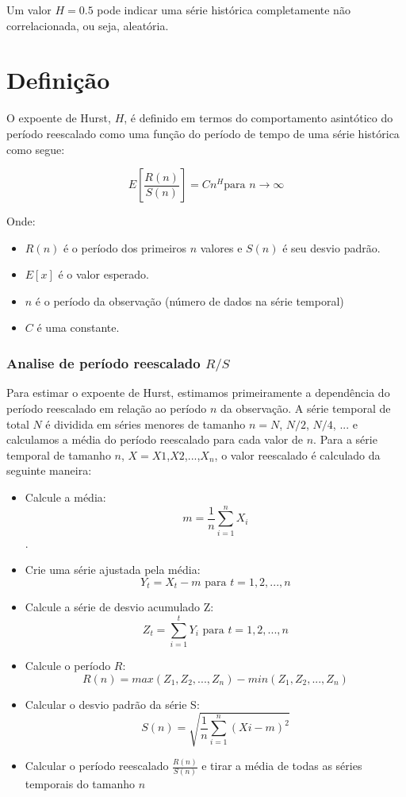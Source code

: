 \documentclass[11pt]{book}
\begin{document}
Um valor $H=0.5$ pode indicar uma série histórica completamente não correlacionada, ou seja, aleatória.

\chapter{Definição}

O expoente de Hurst, $H$, é definido em termos do comportamento asintótico do período reescalado  como uma função do período de tempo de uma série histórica como segue\cite{Qian}\cite{feders}:

\[
    E[\frac{R(n)}{S(n)}] = Cn^H \text{para } n\to\infty
\]

Onde:

\begin{itemize}
    \item $R(n)$ é o período dos primeiros $n$ valores e $S(n)$ é seu desvio padrão.
    \item $E[x]$ é o valor esperado.
    \item $n$ é o período da observação (número de dados na série temporal)
    \item $C$ é uma constante.
\end{itemize}

\subsection{Analise de período reescalado $R/S$}

Para estimar o expoente de Hurst, estimamos primeiramente a dependência do período reescalado em relação ao período $n$ da observação\cite{feders}. A série temporal de total $N$ é dividida em séries menores de tamanho $n=N$, $N/2$, $N/4$, ... e calculamos a média do período reescalado para cada valor de $n$. Para a série temporal de tamanho $n$, $X=X1$,$X2$,...,$X_n$, o valor reescalado é calculado da seguinte maneira:

\begin{itemize}
    \item Calcule a média: $$m=\frac{1}{n}  \sum_{i=1}^{n} X_i$$.
    \item Crie uma série ajustada pela média: $$Y_t = X_t - m \text{ para }  t=1,2,...,n$$
    \item Calcule a série de desvio acumulado Z: $$Z_t = \sum_{i=1}^{t}Y_i \text{ para }  t=1,2,...,n$$ 
    \item Calcule o período $R$: $$ R(n) = max(Z_1,Z_2,...,Z_n) - min(Z_1,Z_2,...,Z_n)$$ 
    \item Calcular o desvio padrão da série S: $$S(n) = \sqrt{\frac{1}{n} \sum_{i=1}^{n} (Xi - m)^2}$$
    \item Calcular o período reescalado $\frac{R(n)}{S(n)}$ e tirar a média de todas as séries temporais do tamanho $n$
\end{itemize}



\end{document}
